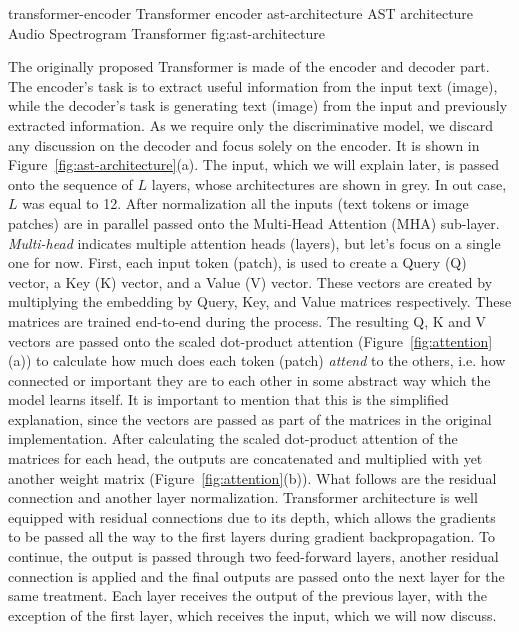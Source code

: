 \asideimagesnocite{4cm}{9.5cm}
	    {transformer-encoder}
	    {Transformer encoder \cite{kolesnikov2021image}}
	    {ast-architecture}
	    {AST architecture \cite{gong2021ast}}
	    {Audio Spectrogram Transformer \cite{kolesnikov2021image, gong2021ast}}
	    {fig:ast-architecture}

The originally proposed Transformer is made of the encoder and decoder part. The encoder's task is to extract useful information from the input text (image), while the decoder's task is generating text (image) from the input and previously extracted information. As we require only the discriminative model, we discard any discussion on the decoder and focus solely on the encoder. It is shown in Figure~\ref{fig:ast-architecture}(a). The input, which we will explain later, is passed onto the sequence of $L$ layers, whose architectures are shown in grey. In out case, $L$ was equal to 12. After normalization all the inputs (text tokens or image patches) are in parallel passed onto the Multi-Head Attention (MHA) sub-layer. \textit{Multi-head} indicates multiple attention heads (layers), but let's focus on a single one for now. First, each input token (patch), is used to create a Query (Q) vector, a Key (K) vector, and a Value (V) vector. These vectors are created by multiplying the embedding by Query, Key, and Value matrices respectively. These matrices are trained end-to-end during the process. The resulting Q, K and V vectors are passed onto the scaled dot-product attention (Figure~\ref{fig:attention}(a)) to calculate how much does each token (patch) \textit{attend} to the others, i.e. how connected or important they are to each other in some abstract way which the model learns itself. It is important to mention that this is the simplified explanation, since the vectors are passed as part of the matrices in the original implementation. After calculating the scaled dot-product attention of the matrices for each head, the outputs are concatenated and multiplied with yet another weight matrix (Figure~\ref{fig:attention}(b)). What follows are the residual connection and another layer normalization. Transformer architecture is well equipped with residual connections due to its depth, which allows the gradients to be passed all the way to the first layers during gradient backpropagation. To continue, the output is passed through two feed-forward layers, another residual connection is applied and the final outputs are passed onto the next layer for the same treatment. Each layer receives the output of the previous layer, with the exception of the first layer, which receives the input, which we will now discuss. 

